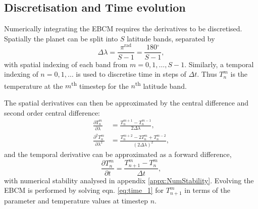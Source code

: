 \documentclass[12pt, onecolumn]{revtex4-2}    %
\newcommand{\radians}{\ensuremath{^{\text{rad}}}}
\newcommand{\degrees}{\ensuremath{^{\circ}}}
\newcommand{\partialderiv}[2]{\frac{\partial {#1}}{\partial {#2}}}
\newcommand{\partialderivsecnd}[2]{\frac{\partial^2 {#1}}{\partial {#2}^2}}
\begin{document}
\subsection{Discretisation and Time evolution} \label{ssec:DiscretisationPDE}
%
Numerically integrating the EBCM requires the derivatives to be discretised.
Spatially the planet can be split into $S$ latitude bands, separated by
\begin{equation}
  \Delta\lambda = \frac{\pi\radians}{S-1} = \frac{180\degrees}{S-1},
  \label{eq:latitude_step}
\end{equation}
with spatial indexing of each band from $m=0, 1, \dots, S-1$.
Similarly, a temporal indexing of $n=0, 1, \dots$ is used to discretise time in steps of $\Delta t$.
Thus $T^m_n$ is the temperature at the $m$\textsuperscript{th} timestep for the $n$\textsuperscript{th} latitude band.

The spatial derivatives can then be approximated by the central difference and second order central difference:
\begin{align}
  \partialderiv{T^m_n}{\lambda}      & = \frac{T^{m+1}_n - T^{m-1}_n}{2 \Delta\lambda},             \label{eq:space_1} \\
  \partialderivsecnd{T^m_n}{\lambda} & = \frac{T^{m+2}_n -2T^m_n + T^{m-2}_n}{(2 \Delta\lambda)^2}, \label{eq:space_2}
\end{align} 
and the temporal derivative can be approximated as a forward difference,
\begin{equation}
  \partialderiv{T^m_n}{t} = \frac{T^m_{n+1} - T^m_n}{\Delta t},
  \label{eq:time_1}
\end{equation}
with numerical stability analysed in appendix \ref{appx:NumStability}.
Evolving the EBCM is performed by solving eqn. \eqref{eq:time_1} for $T^m_{n+1}$ in terms of the parameter and temperature values at timestep $n$.
\end{document}
